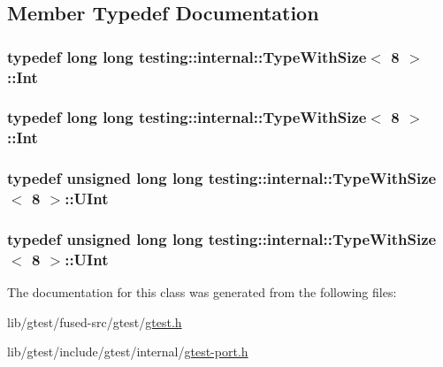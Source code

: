 \subsection{Member Typedef Documentation}
\hypertarget{classtesting_1_1internal_1_1_type_with_size_3_018_01_4_a36d5697e5f5254b0495f13c97d747e36}{
\subsubsection[{Int}]{\setlength{\rightskip}{0pt plus 5cm}typedef long long {\bf testing\-::internal\-::\-Type\-With\-Size}$<$ 8 $>$\-::{\bf Int}}}\label{classtesting_1_1internal_1_1_type_with_size_3_018_01_4_a36d5697e5f5254b0495f13c97d747e36}
\hypertarget{classtesting_1_1internal_1_1_type_with_size_3_018_01_4_a36d5697e5f5254b0495f13c97d747e36}{
\subsubsection[{Int}]{\setlength{\rightskip}{0pt plus 5cm}typedef long long {\bf testing\-::internal\-::\-Type\-With\-Size}$<$ 8 $>$\-::{\bf Int}}}\label{classtesting_1_1internal_1_1_type_with_size_3_018_01_4_a36d5697e5f5254b0495f13c97d747e36}
\hypertarget{classtesting_1_1internal_1_1_type_with_size_3_018_01_4_a747e21c5aee8faf07ec65cd4c3d1ca62}{
\subsubsection[{U\-Int}]{\setlength{\rightskip}{0pt plus 5cm}typedef unsigned long long {\bf testing\-::internal\-::\-Type\-With\-Size}$<$ 8 $>$\-::{\bf U\-Int}}}\label{classtesting_1_1internal_1_1_type_with_size_3_018_01_4_a747e21c5aee8faf07ec65cd4c3d1ca62}
\hypertarget{classtesting_1_1internal_1_1_type_with_size_3_018_01_4_a747e21c5aee8faf07ec65cd4c3d1ca62}{
\subsubsection[{U\-Int}]{\setlength{\rightskip}{0pt plus 5cm}typedef unsigned long long {\bf testing\-::internal\-::\-Type\-With\-Size}$<$ 8 $>$\-::{\bf U\-Int}}}\label{classtesting_1_1internal_1_1_type_with_size_3_018_01_4_a747e21c5aee8faf07ec65cd4c3d1ca62}


The documentation for this class was generated from the following files\-:\begin{DoxyCompactItemize}
\item 
lib/gtest/fused-\/src/gtest/\hyperlink{fused-src_2gtest_2gtest_8h}{gtest.\-h}\item 
lib/gtest/include/gtest/internal/\hyperlink{gtest-port_8h}{gtest-\/port.\-h}\end{DoxyCompactItemize}
